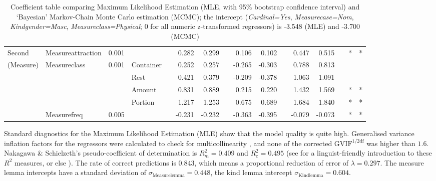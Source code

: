 \documentclass[USenglish]{article}
\begin{document}
\begin{table}
{\begin{tabular}{llrlp{0.5em}rrp{0.5em}rrp{0.5em}rrp{0.5em}cc}
       Second    & Measureattraction &  0.001 &           &&  0.282 &  0.299 &&  0.106 &  0.102 &&  0.447 &  0.515 && * & * \\
       (Measure) & Measureclass      &  0.001 & Container &&  0.252 &  0.257 && -0.265 & -0.303 &&  0.788 &  0.813 &&   &   \\
                 &                   &        & Rest      &&  0.421 &  0.379 && -0.209 & -0.378 &&  1.063 &  1.091 &&   &   \\
                 &                   &        & Amount    &&  0.831 &  0.889 &&  0.215 &  0.220 &&  1.432 &  1.569 && * & * \\
                 &                   &        & Portion   &&  1.217 &  1.253 &&  0.675 &  0.689 &&  1.684 &  1.840 && * & * \\
                 & Measurefreq       &  0.005 &           && -0.231 & -0.232 && -0.363 & -0.395 && -0.079 & -0.073 && * & * \\

  \end{tabular}
  }
  \caption{Coefficient table comparing Maximum Likelihood Estimation (MLE, with 95\% bootstrap confidence interval) and `Bayesian' Markov-Chain Monte Carlo estimation (MCMC); the intercept (\textit{Cardinal=Yes}, \textit{Measurecase=Nom}, \textit{Kindgender=Masc}, \textit{Measureclass=Physical}; 0 for all numeric z-transformed regressors) is -3.548 (MLE) and -3.700 (MCMC)}
  \label{tab:bigtable}
\end{table}


Standard diagnostics for the Maximum Likelihood Estimation (MLE) show that the model quality is quite high.
Generalised variance inflation factors for the regressors were calculated to check for multicollinearity \citep{FoxMonette1992,ZuurEa2010}, and none of the corrected $\text{GVIF}^{1/2\text{df}}$ was higher than $1.6$.
Nakagawa \& Schielzeth's pseudo-coefficient of determination is $R_m^2=0.409$ and $R^2_c=0.495$ (see \citealp{Gries2015} for a linguist-friendly introduction to these $R^2$ measures, or else \citealp{NakagawaSchielzeth2013}).
The rate of correct predictions is $0.843$, which means a proportional reduction of error of $\lambda=0.297$.
The measure lemma intercepts have a standard deviation of $\sigma_{\text{Measurelemma}}=0.448$, the kind lemma intercept $\sigma_{\text{Kindlemma}}=0.604$.
\end{document}
